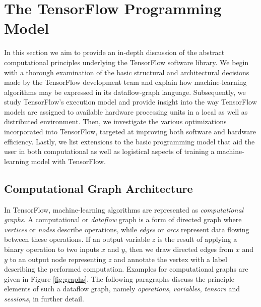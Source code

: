 \section{The TensorFlow Programming Model}\label{sec:model}

In this section we aim to provide an in-depth discussion of the abstract
computational principles underlying the TensorFlow software library. We begin
with a thorough examination of the basic structural and architectural decisions
made by the TensorFlow development team and explain how machine-learning
algorithms may be expressed in its dataflow-graph language. Subsequently, we
study TensorFlow's execution model and provide insight into the way TensorFlow
models are assigned to available hardware processing units in a local as well as
distributed environment. Then, we investigate the various optimizations
incorporated into TensorFlow, targeted at improving both software and hardware
efficiency. Lastly, we list extensions to the basic programming model that aid
the user in both computational as well as logistical aspects of training a
machine-learning model with TensorFlow.

\subsection{Computational Graph Architecture}\label{sec:model-graphs}

In TensorFlow, machine-learning algorithms are represented as
\emph{computational graphs}. A computational or \emph{dataflow} graph is a form
of directed graph where \emph{vertices} or \emph{nodes} describe operations,
while \emph{edges} or \emph{arcs} represent data flowing between these
operations. If an output variable $z$ is the result of applying a binary
operation to two inputs $x$ and $y$, then we draw directed edges from $x$ and
$y$ to an output node representing $z$ and annotate the vertex with a label
describing the performed computation. Examples for computational graphs are
given in Figure \ref{fig:graphs}. The following paragraphs discuss the principle
elements of such a dataflow graph, namely \emph{operations}, \emph{variables},
\emph{tensors} and \emph{sessions}, in further detail.

